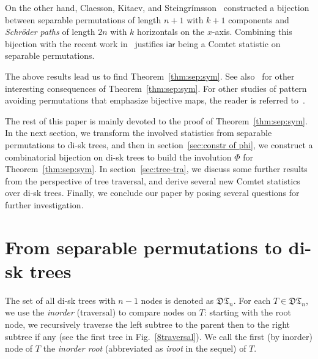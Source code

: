 \documentclass[12pt]{amsart}
\numberwithin{equation}{section}
\theoremstyle{plain}
\theoremstyle{definition}
\def\iar{\mathsf{iar}}
\newcommand{\DT}{\mathfrak{DT}}
\begin{document}
 On the other hand, Claesson, Kitaev, and Steingr\'imsson~\cite[Thm~2.2.48]{kit} constructed a bijection between separable permutations of length $n+1$ with $k+1$ components and {\em Schr\"oder paths} of length $2n$ with $k$ horizontals on the $x$-axis. Combining this bijection with the recent work in~\cite[Thm~3.2]{fw} justifies $\iar$ being a Comtet statistic on separable permutations. 
 
 The above results lead us to find Theorem~\ref{thm:sep:sym}. See also~\cite{flw} for other interesting consequences of Theorem~\ref{thm:sep:sym}.  For other studies of pattern avoiding permutations that emphasize bijective maps, the reader is referred to~\cite{CK,EP,LK,SS}. 

The rest of this paper is mainly devoted to the proof of Theorem~\ref{thm:sep:sym}. In the next section, we transform the involved statistics from separable permutations to di-sk trees, and then in section~\ref{sec:constr of phi}, we construct a combinatorial bijection on di-sk trees to build the involution $\Phi$ for Theorem~\ref{thm:sep:sym}. In section~\ref{sec:tree-tra}, we discuss some further results from the perspective of tree traversal, and derive several new Comtet statistics over di-sk trees. Finally, we conclude our paper by posing several questions for further investigation.




%
%
%



\section{From separable permutations to di-sk trees}
The set of all di-sk trees with $n-1$ nodes is denoted as $\DT_n$. For each $T\in\DT_n$, we use the \emph{inorder} (traversal) to compare nodes on $T$:  starting with the root node, we recursively traverse the left subtree to the parent then to the right subtree if any (see the first tree in Fig.~\ref{8traversal}). We call the first (by inorder) node of $T$ the \emph{inorder root} (abbreviated as {\em iroot} in the sequel) of $T$.
\end{document}
